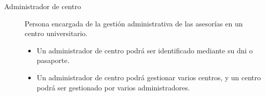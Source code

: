 \begin{description}
      \item[Administrador de centro] Persona encargada de la gestión
      administrativa de las asesorías en un centro universitario.
      \begin{itemize}
       \item Un administrador de centro podrá ser identificado mediante su dni o
       pasaporte.
       \item Un administrador de centro podrá gestionar varios centros, y un
       centro podrá ser gestionado por varios administradores.
      \end{itemize}
 \end{description}

